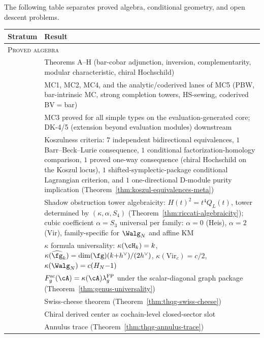 The following table separates proved algebra, conditional geometry,
and open descent problems.

\begin{center}
\renewcommand{\arraystretch}{1.25}
\small
\begin{tabular}{cp{10.5cm}}
\textbf{Stratum} & \textbf{Result} \\
\hline
\multicolumn{2}{l}{\textsc{Proved algebra}} \\[2pt]
& Theorems A--H
 (bar-cobar adjunction, inversion,
 complementarity, modular characteristic,
 chiral Hochschild) \\
& MC1, MC2, MC4, and the analytic/coderived lanes of MC5
 (PBW, bar-intrinsic MC, strong completion towers,
 HS-sewing, coderived BV$=$bar) \\
& MC3 proved for all simple types on the
 evaluation-generated core; DK-4/5
 (extension beyond evaluation modules) downstream \\
& Koszulness criteria: $7$ independent bidirectional
 equivalences, $1$ Barr--Beck--Lurie consequence, $1$
 conditional factorization-homology comparison, $1$ proved
 one-way consequence \textup{(}chiral Hochschild on the Koszul
 locus\textup{)}, $1$ shifted-symplectic-package conditional
 Lagrangian criterion, and $1$ one-directional D-module purity
 implication
 \textup{(}Theorem~\ref{thm:koszul-equivalences-meta}\textup{)} \\
& Shadow obstruction tower algebraicity:
 $H(t)^2 = t^4 Q_L(t)$, tower determined by
 $(\kappa, \alpha, S_4)$
 \textup{(}Theorem~\ref{thm:riccati-algebraicity}\textup{)};
 cubic coefficient $\alpha = S_3$ universal per family:
 $\alpha = 0$ \textup{(}Heis\textup{)},
 $\alpha = 2$ \textup{(}Vir\textup{)},
 family-specific for $\Walg_N$ and affine KM \\
& $\kappa$ formula universality: $\kappa(\cH_k) = k$,
 $\kappa(\widehat{\fg}_k) = \dim(\fg)(k{+}h^\vee)/(2h^\vee)$,
 $\kappa(\mathrm{Vir}_c) = c/2$,
 $\kappa(\Walg_N) = c(H_N{-}1)$ \\
& $F_g^{\mathrm{sc}}(\cA)=\kappa(\cA)\lambda_g^{\mathrm{FP}}$ under
 the scalar-diagonal graph package
 \textup{(}Theorem~\ref{thm:genus-universality}\textup{)} \\
& Swiss-cheese theorem
 \textup{(}Theorem~\ref{thm:thqg-swiss-cheese}\textup{)} \\
& Chiral derived center as cochain-level closed-sector slot \\
& Annulus trace
 \textup{(}Theorem~\ref{thm:thqg-annulus-trace}\textup{)} \\

\end{tabular}
\end{center}
